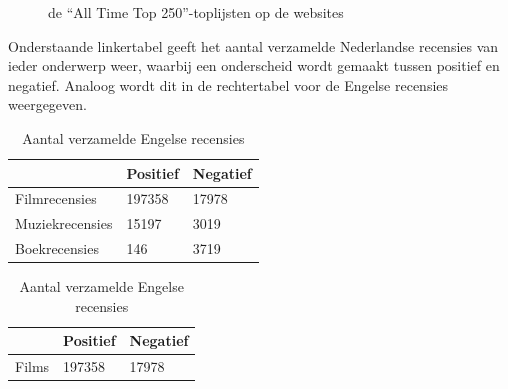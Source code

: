 \begin{figure}%
    \centering
    \caption{de ``All Time Top 250''-toplijsten op de websites}%
\end{figure}

Onderstaande linkertabel geeft het aantal verzamelde Nederlandse recensies van ieder onderwerp weer, waarbij een onderscheid wordt gemaakt tussen positief en negatief. Analoog wordt dit in de rechtertabel voor de Engelse recensies weergegeven.\\

\begin{table}[h]
\centering
\setlength\tabcolsep{2pt}
\begin{minipage}[t]{0.48\textwidth}
\centering
\begin{tabular}{l|l|l|}
\cline{2-3}
                                      & Positief & Negatief \\ \hline
\multicolumn{1}{|l|}{Filmrecensies}   & 197358   & 17978    \\ \hline
\multicolumn{1}{|l|}{Muziekrecensies} & 15197    & 3019     \\ \hline
\multicolumn{1}{|l|}{Boekrecensies}   & 146      & 3719     \\ \hline
\end{tabular}
\caption{Aantal verzamelde Nederlandse recensies} 
\label{tabel: aantal verzamelde Nederlandse recensies}
\end{minipage}%
\hfill
\begin{minipage}[t]{0.48\textwidth}
\centering
\begin{tabular}{l|l|l|}
\cline{2-3}
                            & Positief & Negatief \\ \hline
\multicolumn{1}{|l|}{Films} & 197358   & 17978    \\ \hline
\end{tabular}
\caption{Aantal verzamelde Engelse recensies}
\end{minipage}
\end{table}


